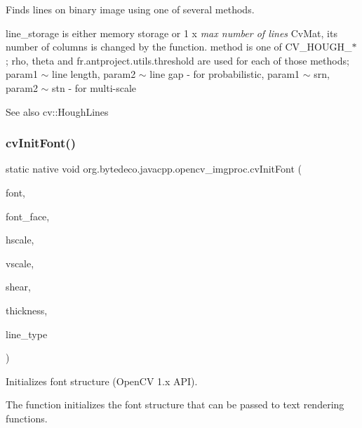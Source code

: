Finds lines on binary image using one of several methods. 

line\+\_\+storage is either memory storage or 1 x {\itshape max number of lines} Cv\+Mat, its number of columns is changed by the function. method is one of C\+V\+\_\+\+H\+O\+U\+G\+H\+\_\+$\ast$; rho, theta and fr.antproject.utils.threshold are used for each of those methods; param1 $\sim$ line length, param2 $\sim$ line gap -\/ for probabilistic, param1 $\sim$ srn, param2 $\sim$ stn -\/ for multi-\/scale \begin{DoxySeeAlso}{See also}
cv\+::\+Hough\+Lines 
\end{DoxySeeAlso}
\mbox{\label{group__imgproc__c_ga7802f35f4ff9683ba622d633d5b17a25}} 
\subsubsection{\texorpdfstring{cv\+Init\+Font()}{cvInitFont()}}
{\footnotesize\ttfamily static native void org.\+bytedeco.\+javacpp.\+opencv\+\_\+imgproc.\+cv\+Init\+Font (\begin{DoxyParamCaption}\item[{Cv\+Font}]{font,  }\item[{int}]{font\+\_\+face,  }\item[{double}]{hscale,  }\item[{double}]{vscale,  }\item[{double}]{shear,  }\item[{int}]{thickness,  }\item[{int}]{line\+\_\+type }\end{DoxyParamCaption})\hspace{0.3cm}{\ttfamily [static]}}



Initializes font structure (Open\+CV 1.\+x A\+PI). 

The function initializes the font structure that can be passed to text rendering functions. 


